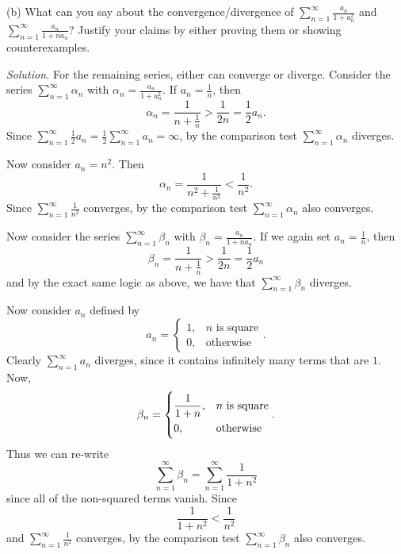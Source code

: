 \documentclass{article}
\begin{document}
(b) What can you say about the convergence/divergence of $\sum_{n =
1}^\infty \frac{a_n}{1 + a_n^2}$ and $\sum_{n = 1}^\infty \frac{a_n}{1 +
n a_n}$? Justify your claims by either proving them or showing
counterexamples.

\textit{Solution.}
For the remaining series, either can converge or diverge. Consider the
series $\sum_{n = 1}^\infty \alpha_n$ with $\alpha_n = \frac{a_n}{1 +
a_n^2}$. If $a_n = \frac{1}{n}$, then
%
\begin{equation*}
    \alpha_n = \frac{1}{n + \frac{1}{n}} > \frac{1}{2 n} = \frac{1}{2} a_n
    .
\end{equation*}
%
Since $\sum_{n = 1}^\infty \frac{1}{2} a_n = \frac{1}{2}\sum_{n =
1}^\infty a_n = \infty$, by the comparison test $\sum_{n = 1}^\infty
\alpha_n$ diverges.

Now consider $a_n = n^2$. Then
%
\begin{equation*}
    \alpha_n = \frac{1}{n^2 + \frac{1}{n^2}} < \frac{1}{n^2}
    .
\end{equation*}
%
Since $\sum_{n = 1}^\infty \frac{1}{n^2}$ converges, by the comparison
test $\sum_{n = 1}^\infty \alpha_n$ also converges.

Now consider the series $\sum_{n = 1}^\infty \beta_n$ with $\beta_n =
\frac{a_n}{1 + n a_n}$. If we again set $a_n = \frac{1}{n}$, then
%
\begin{equation*}
    \beta_n = \frac{1}{n + \frac{1}{n}} > \frac{1}{2 n} = \frac{1}{2} a_n
\end{equation*}
%
and by the exact same logic as above, we have that $\sum_{n = 1}^\infty
\beta_n$ diverges.

Now consider $a_n$ defined by
%
\begin{equation*}
    a_n =
    \begin{cases}
        1,& \text{$n$ is square} \\
        0,& \text{otherwise}
    \end{cases}
    .
\end{equation*}
%
Clearly $\sum_{n = 1}^\infty a_n$ diverges, since it contains infinitely
many terms that are $1$. Now,
%
\begin{equation*}
    \beta_n =
    \begin{dcases}
        \frac{1}{1 + n},& \text{$n$ is square} \\
        0,& \text{otherwise}
    \end{dcases}
    .
\end{equation*}
%
Thus we can re-write
%
\begin{equation*}
    \sum_{n = 1}^\infty \beta_n = \sum_{n = 1}^\infty \frac{1}{1 + n^2}
\end{equation*}
%
since all of the non-squared terms vanish. Since
%
\begin{equation*}
    \frac{1}{1 + n^2} < \frac{1}{n^2}
\end{equation*}
%
and $\sum_{n = 1}^\infty \frac{1}{n^2}$ converges, by the comparison
test $\sum_{n = 1}^\infty \beta_n$ also converges.
\end{document}
